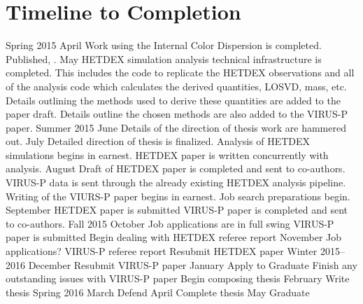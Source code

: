 \documentclass[12pt]{article}
\begin{document}
\section{Timeline to Completion}
\begin{outline}[enumerate]
	\1 Spring 2015
		\2 April
			\3 Work using the Internal Color Dispersion is completed. Published, \cite{Boada2015}.
		\2 May
			\3 HETDEX simulation analysis technical infrastructure is completed. This includes the code to replicate the HETDEX observations and all of the analysis code which calculates the derived quantities, LOSVD, mass, etc. 
			\3 Details outlining the methods used to derive these quantities are added to the paper draft. 
			\3 Details outline the chosen methods are also added to the VIRUS-P paper. 
	\1 Summer 2015
		\2 June
			\3 Details of the direction of thesis work are hammered out.
		\2 July
			\3 Detailed direction of thesis is finalized. 
			\3 Analysis of HETDEX simulations begins in earnest.
			\3 HETDEX paper is written concurrently with analysis.
		\2 August
			\3 Draft of HETDEX paper is completed and sent to co-authors.
			\3 VIRUS-P data is sent through the already existing HETDEX analysis pipeline.
			\3 Writing of the VIURS-P paper begins in earnest.
			\3 Job search preparations begin.
		\2 September
			\3 HETDEX paper is submitted
			\3 VIRUS-P paper is completed and sent to co-authors.
	\1 Fall 2015
		\2 October
			\3 Job applications are in full swing
			\3 VIRUS-P paper is submitted
			\3 Begin dealing with HETDEX referee report
		\2 November
			\3 Job applications?
			\3 VIRUS-P referee report
			\3 Resubmit HETDEX paper
	\1 Winter 2015--2016
		\2 December
			\3 Resubmit VIRUS-P paper
		\2 January
			\3 Apply to Graduate
			\3 Finish any outstanding issues with VIRUS-P paper
			\3 Begin composing thesis
		\2 February
			\3 Write thesis
	\1 Spring 2016
		\2 March
			\3 Defend
		\2 April
			\3 Complete thesis
		\2 May
			\3 Graduate
\end{outline}

\end{document}
